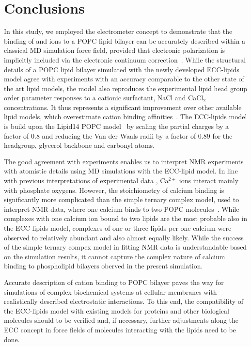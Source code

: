 \documentclass[aip,jcp,twocolumn]{revtex4}
\begin{document}
\section{Conclusions}

In this study, we employed the electrometer concept to demonstrate that the binding of  and  ions
to a POPC lipid bilayer can be accurately described within a classical MD simulation 
force field, provided that electronic polarization is implicitly included via 
the electronic continuum correction~\cite{leontyev11}.
While the structural details of a POPC lipid bilayer simulated with the newly developed ECC-lipids
model agree with experiments with an accuracy comparable to the other state of the art lipid models,
the model also reproduces the experimental lipid head group order parameter responses to
a cationic surfactant, NaCl and CaCl$_2$ concentrations. 
It thus represents a significant improvement over 
other available lipid models, which overestimate cation binding affinities~\cite{catte16}.  
The ECC-lipids model is build upon
the Lipid14 POPC model~\cite{dickson14} by scaling the partial charges by a factor of 0.8
and reducing the Van der Waals radii by a factor of 0.89 for the headgroup, glycerol backbone and carbonyl atoms. 

The good agreement with experiments enables us to 
interpret NMR experiments with atomistic details using MD simulations with the ECC-lipid model.
In line with previous interpretations of experimental data \cite{hauser76,hauser78,herbette84,binder02},
Ca$^{2+}$ ions interact mainly with phosphate oxygens.
However, the stoichiometry of calcium binding is significantly more complicated than
the simple ternary complex model, used to interpret NMR data, where one calcium binds to two POPC molecules~\cite{altenbach84}.
While complexes with one calcium ion bound to two lipids are the most probable also in the
ECC-lipids model, complexes of one or three lipids per one calcium
were observed to relatively abundant and also almost equally likely. While the success of the simple ternary
compex model in fitting NMR data is understandable based on the simulation results,
it cannot capture the complex nature of calcium binding to phospholipid bilayers
oberved in the present simulation.

Accurate description of cation binding to POPC bilayer paves the way for
simulations of complex biochemical systems at cellular membranes with realistically described
electrostatic interactions. To this end, the compatibility of
the ECC-lipids model with existing models for proteins and other biological molecules should to be verified and, if necessary, 
further adjustments along the ECC concept in force fields of molecules interacting with the lipids need to be done.
\end{document}
